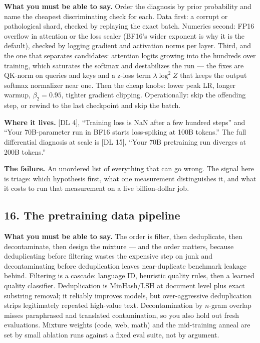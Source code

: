 \textbf{What you must be able to say.} Order the diagnosis by prior probability and name the cheapest discriminating check for each. Data first: a corrupt or pathological shard, checked by replaying the exact batch. Numerics second: FP16 overflow in attention or the loss scaler (BF16's wider exponent is why it is the default), checked by logging gradient and activation norms per layer. Third, and the one that separates candidates: attention logits growing into the hundreds over training, which saturates the softmax and destabilizes the run --- the fixes are QK-norm on queries and keys and a z-loss term $\lambda \log^2 Z$ that keeps the output softmax normalizer near one. Then the cheap knobs: lower peak LR, longer warmup, $\beta_2 = 0.95$, tighter gradient clipping. Operationally: skip the offending step, or rewind to the last checkpoint and skip the batch.

\textbf{Where it lives.} [DL 4], ``Training loss is NaN after a few hundred steps'' and ``Your 70B-parameter run in BF16 starts loss-spiking at 100B tokens.'' The full differential diagnosis at scale is [DL 15], ``Your 70B pretraining run diverges at 200B tokens.''

\textbf{The failure.} An unordered list of everything that can go wrong. The signal here is triage: which hypothesis first, what one measurement distinguishes it, and what it costs to run that measurement on a live billion-dollar job.

\subsection*{16. The pretraining data pipeline}

\textbf{What you must be able to say.} The order is filter, then deduplicate, then decontaminate, then design the mixture --- and the order matters, because deduplicating before filtering wastes the expensive step on junk and decontaminating before deduplication leaves near-duplicate benchmark leakage behind. Filtering is a cascade: language ID, heuristic quality rules, then a learned quality classifier. Deduplication is MinHash/LSH at document level plus exact substring removal; it reliably improves models, but over-aggressive deduplication strips legitimately repeated high-value text. Decontamination by $n$-gram overlap misses paraphrased and translated contamination, so you also hold out fresh evaluations. Mixture weights (code, web, math) and the mid-training anneal are set by small ablation runs against a fixed eval suite, not by argument.

